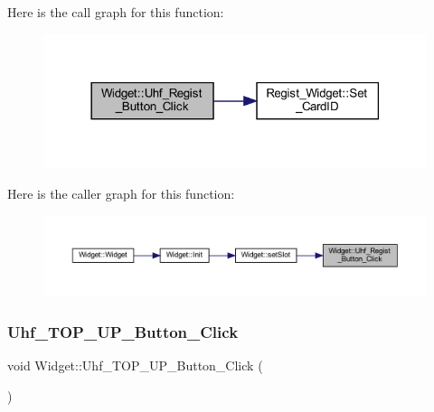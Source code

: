 Here is the call graph for this function\+:
\nopagebreak
\begin{figure}[H]
\begin{center}
\leavevmode
\includegraphics[width=318pt]{class_widget_aaa7751b71135c9c841b9036d25570134_cgraph}
\end{center}
\end{figure}
Here is the caller graph for this function\+:
\nopagebreak
\begin{figure}[H]
\begin{center}
\leavevmode
\includegraphics[width=350pt]{class_widget_aaa7751b71135c9c841b9036d25570134_icgraph}
\end{center}
\end{figure}
\mbox{\label{class_widget_aeec0c7444513091532005eef26048a91}} 
\subsubsection{\texorpdfstring{Uhf\_TOP\_UP\_Button\_Click}{Uhf\_TOP\_UP\_Button\_Click}}
{\footnotesize\ttfamily void Widget\+::\+Uhf\+\_\+\+T\+O\+P\+\_\+\+U\+P\+\_\+\+Button\+\_\+\+Click (\begin{DoxyParamCaption}{ }\end{DoxyParamCaption})\hspace{0.3cm}{\ttfamily [slot]}}

